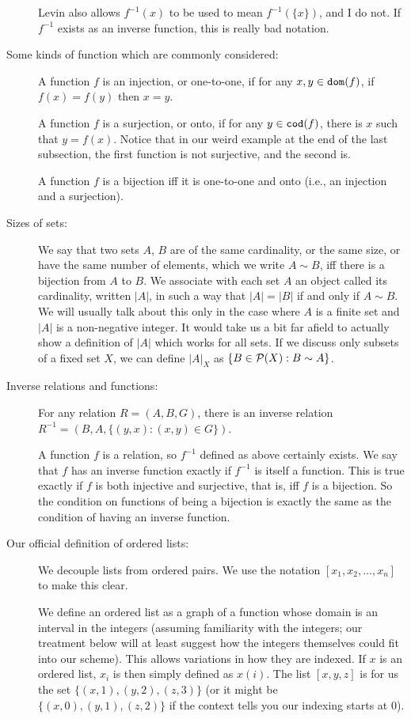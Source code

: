 \documentclass[12pt]{article}
\begin{document}
\begin{description}
Levin also allows $f^{-1}(x)$ to be used to mean $f^{-1}(\{x\})$, and I do not.  If $f^{-1}$ exists as an inverse function, this is really bad notation.


\item[Some kinds of function which are commonly considered:]

A function $f$ is an injection, or one-to-one, if for any $x,y \in {\tt dom}(f)$, if $f(x)=f(y)$ then $x=y$.

A function $f$ is a surjection, or onto, if for any $y \in {\tt cod}(f)$, there is $x$ such that $y = f(x)$.  Notice that in our weird example at the end of the last subsection, the first function is not surjective, and the second is.

A function $f$ is a bijection iff it is one-to-one and onto (i.e., an injection and a surjection).

\item[Sizes of sets:]  We say that two sets $A$, $B$ are of the same cardinality, or the same size, or have the same number of elements, which we write $A \sim B$, iff there is a bijection from $A$ to $B$.  We associate with each set $A$ an object called its cardinality, written $|A|$, in such a way that $|A| = |B|$ if and only if $A \sim B$.  We will usually talk about this only in the case where $A$ is a finite set
and $|A|$ is a non-negative integer.  It would take us a bit far afield to actually show a definition of $|A|$ which works for all sets.  If we discuss only subsets of a fixed set $X$, we can define $|A|_X$ as
$\{B \in {\cal P}(X):B \sim A\}$.

\item[Inverse relations and functions:]

For any relation $R=(A,B,G)$, there is an inverse relation $R^{-1} = (B,A,\{(y,x):(x,y)\in G\})$.

A function $f$ is a relation, so $f^{-1}$ defined as above certainly exists.  We say that $f$ has an inverse function exactly if $f^{-1}$ is itself a function.  This is true exactly if $f$ is both injective and surjective, that is, iff $f$ is a bijection.  So the condition on functions of being a bijection is exactly the same as the condition of having an inverse function.

\item[Our official definition of ordered lists:]  We decouple lists from ordered pairs.  We use the notation
$[x_1,x_2,\ldots,x_n]$ to make this clear.

We define an ordered list as a graph of a function whose domain is an interval in the integers (assuming familiarity with the integers;  our treatment below will at least suggest how the integers themselves could fit into our scheme).  This allows variations in how
they are indexed.  If $x$ is an ordered list, $x_i$ is then simply defined as $x(i)$.  The list $[x,y,z]$ is for us
the set $\{(x,1),(y,2),(z,3)\}$ (or it might be $\{(x,0),(y,1),(z,2)\}$ if the context tells you our indexing starts at 0).


\end{description}
\end{document}
